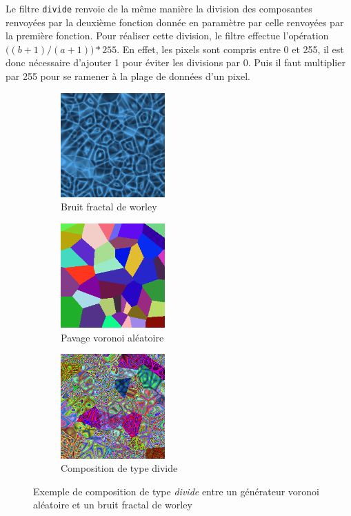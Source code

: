 \documentclass[11pt]{article}
\begin{document}
Le filtre \texttt{divide} renvoie de la même manière la division des composantes renvoyées par la deuxième fonction donnée en paramètre par celle renvoyées par la première fonction. Pour réaliser cette division, le filtre effectue l'opération $\big((b+1)/(a+1)\big)*255$. En effet, les pixels sont compris entre 0 et 255, il est donc nécessaire d'ajouter 1 pour éviter les divisions par 0. Puis il faut multiplier par 255 pour se ramener à la plage de données d'un pixel. \\

\begin{figure}[H]
    \centering
    \begin{subfigure}{0.3\textwidth}
    \centering
            \includegraphics[width=4cm]{fractal-Worley.png}
        \caption{Bruit fractal de worley}
        \label{fig:fractal-Worley}
    \end{subfigure}
    \begin{subfigure}{0.3\textwidth}
    \centering
        \includegraphics[width=4cm]{voronoi-random.png}
        \caption{Pavage voronoi aléatoire}
        \label{fig:voronoi-rng}
    \end{subfigure}
    \begin{subfigure}{0.3\textwidth}
    \centering
        \includegraphics[width=4cm]{fractal-Worley-divide-voronoi.png}
        \caption{Composition de type divide}
        \label{fig:voronoi-fractal-Worley}
    \end{subfigure}
    \caption{Exemple de composition de type \textit{divide} entre un générateur voronoi aléatoire et un bruit fractal de worley}
    \label{fig:divide}
\end{figure}
\end{document}
